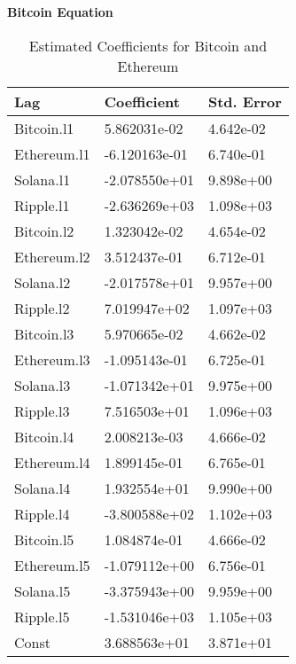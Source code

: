 \begin{table}[ht]
\centering
\caption{Estimated Coefficients for Bitcoin and Ethereum}
\begin{multicols}{2}
\noindent
\textbf{Bitcoin Equation}
\begin{tabular}{|l|l|l|}
\hline
\textbf{Lag} & \textbf{Coefficient} & \textbf{Std. Error} \\
\hline
Bitcoin.l1     & 5.862031e-02 & 4.642e-02 \\
Ethereum.l1    & -6.120163e-01 & 6.740e-01 \\
Solana.l1      & -2.078550e+01 & 9.898e+00 \\
Ripple.l1      & -2.636269e+03 & 1.098e+03 \\
\hline
Bitcoin.l2     & 1.323042e-02 & 4.654e-02 \\
Ethereum.l2    & 3.512437e-01 & 6.712e-01 \\
Solana.l2      & -2.017578e+01 & 9.957e+00 \\
Ripple.l2      & 7.019947e+02 & 1.097e+03 \\
\hline
Bitcoin.l3     & 5.970665e-02 & 4.662e-02 \\
Ethereum.l3    & -1.095143e-01 & 6.725e-01 \\
Solana.l3      & -1.071342e+01 & 9.975e+00 \\
Ripple.l3      & 7.516503e+01 & 1.096e+03 \\
\hline
Bitcoin.l4     & 2.008213e-03 & 4.666e-02 \\
Ethereum.l4    & 1.899145e-01 & 6.765e-01 \\
Solana.l4      & 1.932554e+01 & 9.990e+00 \\
Ripple.l4      & -3.800588e+02 & 1.102e+03 \\
\hline
Bitcoin.l5     & 1.084874e-01 & 4.666e-02 \\
Ethereum.l5    & -1.079112e+00 & 6.756e-01 \\
Solana.l5      & -3.375943e+00 & 9.959e+00 \\
Ripple.l5      & -1.531046e+03 & 1.105e+03 \\
\hline
Const          & 3.688563e+01 & 3.871e+01 \\
\hline
\end{tabular}

\columnbreak


\end{multicols}
\end{table}
